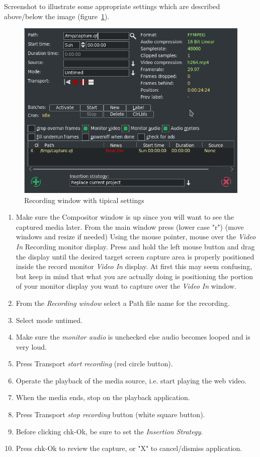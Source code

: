 Screenshot to illustrate some appropriate settings which are described above/below the image (figure~\ref{fig:recording01}).

\begin{figure}[htpb]
    \centering
    \includegraphics[width=0.8\linewidth]{images/recording01.png}
    \caption{Recording window with tipical settings}
    \label{fig:recording01}
\end{figure}

\begin{enumerate}[start=3]    
    \item Make sure the Compositor window is up since you will want to see the captured media later. From the main window press (lower case "r") (move windows and resize if needed) Using the mouse pointer, mouse over the \textit{Video In} Recording monitor display. Press and hold the left mouse button and drag the display until the desired target screen capture area is properly positioned inside the record monitor \textit{Video In} display.  At first this may seem confusing, but keep in mind that what you are actually doing is positioning the portion of your monitor display you want to capture over the \textit{Video In} window.
    \item From the \textit{Recording window} select a Path file name for the recording.
    \item Select mode untimed.
    \item Make sure the \textit{monitor audio} is unchecked else audio becomes looped and is very loud.
    \item Press Transport \textit{start recording} (red circle button).
    \item Operate the playback of the media source, i.e. start playing the web video.
    \item When the media ends, stop on the playback application.
    \item Press Transport \textit{stop recording} button (white square button).
    \item Before clicking chk-Ok, be sure to set the \textit{Insertion Strategy}.
    \item Press chk-Ok to review the capture, or "X" to cancel/dismiss application.    
\end{enumerate}


